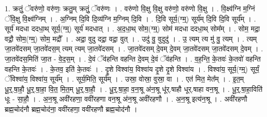 \documentclass[17pt]{extarticle}
\begin{document}
1. क्रतुं॒ ॅवरु॑णो॒ वरु॑णः॒ क्रतु॒म् क्रतुं॒ ॅवरु॑णः । . वरु॑णो वि॒क्षु वि॒क्षु वरु॑णो॒ वरु॑णो वि॒क्षु । . वि॒क्ष्व॑ग्नि म॒ग्निं ॅवि॒क्षु वि॒क्ष्व॑ग्निम् । . अ॒ग्निम् दि॒वि दि॒व्य॑ग्नि म॒ग्निम् दि॒वि । . दि॒वि सूर्य॒(ग्म्॒) सूर्य॑म् दि॒वि दि॒वि सूर्य᳚म् । . सूर्य॑ मदधा ददधा॒थ् सूर्य॒(ग्म्॒) सूर्य॑ मदधात् । . अ॒द॒धा॒थ् सोम॒(ग्म्॒) सोम॑ मदधा ददधा॒थ् सोम᳚म् । . सोम॒ मद्रा॒ वद्रौ॒ सोम॒(ग्म्॒) सोम॒ मद्रौ᳚ । . अद्रा॒ वुदु दद्रा॒ वद्रा॒ वुत् । . उदु॑ वु॒ वुदुदु॑ । . उ॒ त्यम् त्य मु॑ वु॒ त्यम् । . त्यम् जा॒तवे॑दसम् जा॒तवे॑दस॒म् त्यम् त्यम् जा॒तवे॑दसम् । . जा॒तवे॑दसम् दे॒वम् दे॒वम् जा॒तवे॑दसम् जा॒तवे॑दसम् दे॒वम् । . जा॒तवे॑दस॒मिति॑ जा॒त - वे॒द॒स॒म् । . दे॒वं ॅव॑हन्ति वहन्ति दे॒वम् दे॒वं ॅव॑हन्ति । . व॒ह॒न्ति॒ के॒तवः॑ के॒तवो॑ वहन्ति वहन्ति के॒तवः॑ । . के॒तव॒ इति॑ के॒तवः॑ । . दृ॒शे विश्वा॑य॒ विश्वा॑य दृ॒शे दृ॒शे विश्वा॑य । . विश्वा॑य॒ सूर्य॒(ग्म्॒) सूर्यं॒ ॅविश्वा॑य॒ विश्वा॑य॒ सूर्य᳚म् । . सूर्य॒मिति॒ सूर्य᳚म् । . उस्रा॒ वोस्रा॒ वुस्रा॒ वा । . एत॑ मित॒ मेत᳚म् । . इ॒त॒म् धू॒र्॒.षा॒हौ॒ धू॒र्॒.षा॒हा॒ वि॒त॒ मि॒त॒म् धू॒र्॒.षा॒हौ॒ । . धू॒र्॒.षा॒हा॒ व॒न॒श्रू अ॑न॒श्रू धू॑र्.षाहौ धूर्.षाहा वन॒श्रू । . धू॒र्॒.षा॒हा॒विति॑ धूः - सा॒हौ॒ । . अ॒न॒श्रू अवी॑रहणा॒ ववी॑रहणा वन॒श्रू अ॑न॒श्रू अवी॑रहणौ । . अ॒न॒श्रू इत्य॑न॒श्रू । . अवी॑रहणौ ब्रह्म॒चोद॑नौ ब्रह्म॒चोद॑ना॒ ववी॑रहणा॒ ववी॑रहणौ ब्रह्म॒चोद॑नौ । \newline
\end{document}
